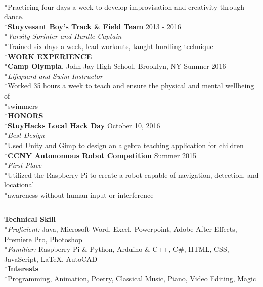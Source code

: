 \documentclass[11pt]{letter}
\begin{document}
\begin{flushleft}
\\*\qquad Practicing four days a week to develop improvisation and creativity through dance. 
\\*\textbf{Stuyvesant Boy's Track \& Field Team} \hfill 2013 - 2016
\\*\textit{Varsity Sprinter and Hurdle Captain}
\\*\qquad Trained six days a week, lead workouts, taught hurdling technique
\vspace{7.5mm}
\\*\large\textbf{WORK EXPERIENCE}
\\*\normalsize\textbf{Camp Olympia}, John Jay High School, Brooklyn, NY \hfill Summer 2016
\\*\textit{Lifeguard and Swim Instructor}
\\*\qquad Worked 35 hours a week to teach and ensure the physical and mental wellbeing of 
\\*\qquad swimmers
\vspace{7.5mm}
\\*\large\textbf{HONORS}
\\*\normalsize\textbf{StuyHacks Local Hack Day} \hfill October 10, 2016
\\*\textit{Best Design}
\\*\qquad Used Unity and Gimp to design an algebra teaching application for children
\\*\textbf{CCNY Autonomous Robot Competition} \hfill Summer 2015
\\*\textit{First Place}
\\*\qquad Utilized the Raspberry Pi to create a robot capable of navigation, detection, and locational \\*\qquad awareness without human input or interference
\bigskip
\vspace{-5mm}\rule{\textwidth}{1pt}
\textbf{Technical Skill}
\\*\textit{Proficient: }Java, Microsoft Word, Excel, Powerpoint, Adobe After Effects, Premiere Pro, Photoshop
\\*\textit{Familiar: }Raspberry Pi \& Python, Arduino \& C++, C\#, HTML, CSS, JavaScript, LaTeX, AutoCAD
\\*\textbf{Interests}
\\*Programming, Animation, Poetry, Classical Music, Piano, Video Editing, Magic


\end{flushleft}
\end{document}
